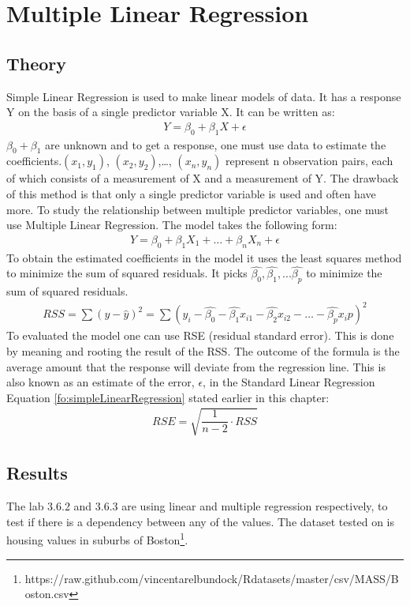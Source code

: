\section{Multiple Linear Regression}\label{sc:multipleLinearRegression}

\subsection{Theory}
Simple Linear Regression is used to make linear models of data. It has a response Y on the basis of a single predictor variable X. It can be written as:
\begin{align}\label{fo:simpleLinearRegression}
Y = \beta_0 + \beta_1 X + \epsilon
\end{align}
$ \beta_0 + \beta_1 $ are unknown and to get a response, one must use data to estimate the coefficients.$(x_1, y_1)$, $(x_2, y_2)$,\dots, $(x_n, y_n)$ represent n observation pairs, each of which consists of a measurement of X and a measurement of Y. The drawback of this method is that only a single predictor variable is used and often have more. To study the relationship between multiple predictor variables, one must use Multiple Linear Regression. The model takes the following form:
\begin{align}\label{fo:multipleLinearRegression}
Y = \beta_0 + \beta_1 X_1 + \ldots + \beta_n X_n + \epsilon
\end{align}
To obtain the estimated coefficients in the model it uses the least squares method to minimize the sum of squared residuals. It picks $\hat{\beta_0}, \hat{\beta_1}, ... \hat{\beta_p}$ to minimize the sum of squared residuals.
\begin{align}\label{fo:rss}
RSS = \sum (y - \hat{y})^2 = \sum( y_i - \hat{\beta_0} - \hat{\beta_1}x_{i1} - \hat{\beta_2}x_{i2} - \ldots - \hat{\beta_p}x_\textit{i}p )^2
\end{align}
To evaluated the model one can use RSE (residual standard error). This is done by meaning and rooting the result of the RSS. The outcome of the formula is the average amount that the response will deviate from the regression line. This is also known as an estimate of the error, $\epsilon$, in the Standard Linear Regression Equation \ref{fo:simpleLinearRegression} stated earlier in this chapter:
\begin{align}\label{fo:rse}
RSE = \sqrt{\dfrac{1}{n-2}\cdot RSS}
\end{align}


\subsection{Results}
The lab 3.6.2 and 3.6.3 are using linear and multiple regression respectively, to test if there is a dependency between any of the values. The dataset tested on is housing values in suburbs of Boston\footnote{https://raw.github.com/vincentarelbundock/Rdatasets/master/csv/MASS/Boston.csv}.

